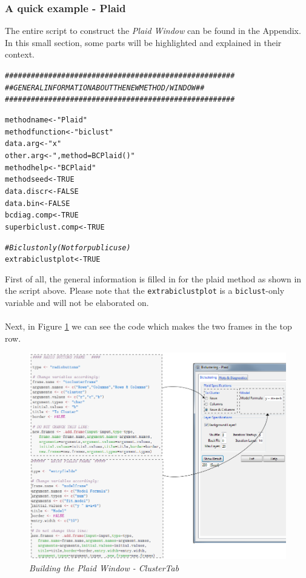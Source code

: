 \documentclass[a4paper]{article}\usepackage[]{graphicx}\usepackage[]{color}
\makeatletter
\newcommand{\hlnum}[1]{\textcolor[rgb]{0.686,0.059,0.569}{#1}}%
\newcommand{\hlstr}[1]{\textcolor[rgb]{0.192,0.494,0.8}{#1}}%
\newcommand{\hlcom}[1]{\textcolor[rgb]{0.678,0.584,0.686}{\textit{#1}}}%
\newcommand{\hlstd}[1]{\textcolor[rgb]{0.345,0.345,0.345}{#1}}%
\newcommand{\hlkwb}[1]{\textcolor[rgb]{0.69,0.353,0.396}{#1}}%
\newenvironment{kframe}{%
 \def\at@end@of@kframe{}%
 \ifinner\ifhmode%
  \def\at@end@of@kframe{\end{minipage}}%
  \begin{minipage}{\columnwidth}%
 \fi\fi%
 \def\FrameCommand##1{\hskip\@totalleftmargin \hskip-\fboxsep
 \colorbox{shadecolor}{##1}\hskip-\fboxsep
     \hskip-\linewidth \hskip-\@totalleftmargin \hskip\columnwidth}%
 \MakeFramed {\advance\hsize-\width
   \@totalleftmargin\z@ \linewidth\hsize
   \@setminipage}}%
 {\par\unskip\endMakeFramed%
 \at@end@of@kframe}
\newenvironment{knitrout}{}{} %
\makeatother
\begin{document}
\subsubsection{A quick example - Plaid}
The entire script to construct the {\it Plaid Window} can be found in the
Appendix. In this small section, some parts will be highlighted and explained in
their context.
\begin{knitrout}
\color{fgcolor}\begin{kframe}
\begin{alltt}
\hlcom{#####################################################}
\hlcom{## GENERAL INFORMATION ABOUT THE NEW METHOD/WINDOW ##}
\hlcom{#####################################################}

\hlstd{methodname} \hlkwb{<-} \hlstr{"Plaid"}
\hlstd{methodfunction} \hlkwb{<-} \hlstr{"biclust"}
\hlstd{data.arg} \hlkwb{<-} \hlstr{"x"}
\hlstd{other.arg} \hlkwb{<-} \hlstr{",method=BCPlaid()"}
\hlstd{methodhelp} \hlkwb{<-} \hlstr{"BCPlaid"}
\hlstd{methodseed} \hlkwb{<-} \hlnum{TRUE}
\hlstd{data.discr} \hlkwb{<-} \hlnum{FALSE}
\hlstd{data.bin} \hlkwb{<-} \hlnum{FALSE}
\hlstd{bcdiag.comp} \hlkwb{<-} \hlnum{TRUE}
\hlstd{superbiclust.comp} \hlkwb{<-} \hlnum{TRUE}

\hlcom{# Biclust only (Not for public use)}
\hlstd{extrabiclustplot} \hlkwb{<-} \hlnum{TRUE}
\end{alltt}
\end{kframe}
\end{knitrout}
\noindent First of all, the general information is filled in for the plaid
method as shown in the script above. Please note that the
\verb|extrabiclustplot| is a \verb|biclust|-only variable and will not be elaborated on.
\\ \\
Next, in Figure \ref{plaid_clusterbuild} we can see the code which makes the two
frames in the top row.
\begin{figure}[H]
\centering
\includegraphics[scale=0.45]{figures/plaid_clusterbuild.png}
\caption{{\it Building the Plaid Window - ClusterTab}
\label{plaid_clusterbuild}}
\end{figure}
\end{document}
